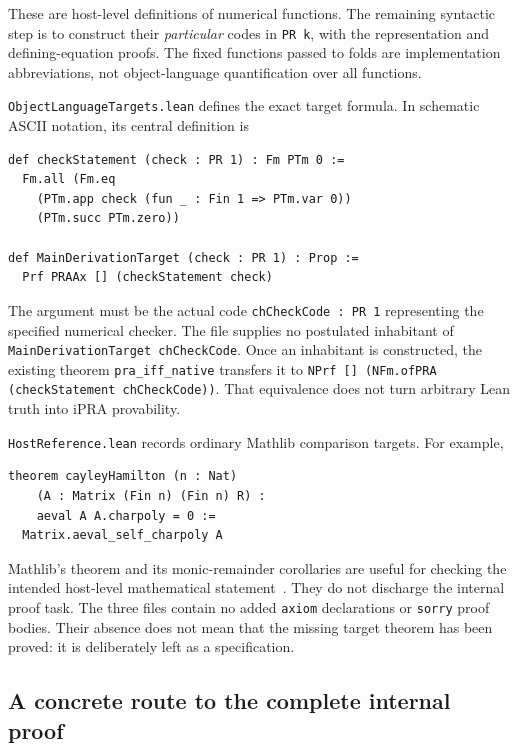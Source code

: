 These are host-level definitions of numerical functions. The remaining
syntactic step is to construct their \emph{particular} codes in
\texttt{PR k}, with the representation and defining-equation proofs.
The fixed functions passed to folds are implementation abbreviations,
not object-language quantification over all functions.

\texttt{ObjectLanguageTargets.lean} defines the exact target formula.
In schematic ASCII notation, its central definition is
\begin{lstlisting}
def checkStatement (check : PR 1) : Fm PTm 0 :=
  Fm.all (Fm.eq
    (PTm.app check (fun _ : Fin 1 => PTm.var 0))
    (PTm.succ PTm.zero))

def MainDerivationTarget (check : PR 1) : Prop :=
  Prf PRAAx [] (checkStatement check)
\end{lstlisting}
The argument must be the actual code \texttt{chCheckCode : PR 1}
representing the specified numerical checker. The file supplies no
postulated inhabitant of \texttt{MainDerivationTarget chCheckCode}.
Once an inhabitant is constructed, the existing theorem
\texttt{pra\_iff\_native} transfers it to
\texttt{NPrf [] (NFm.ofPRA (checkStatement chCheckCode))}.
That equivalence does not turn arbitrary Lean truth into iPRA provability.

\texttt{HostReference.lean} records ordinary Mathlib comparison targets.
For example,
\begin{lstlisting}
theorem cayleyHamilton (n : Nat)
    (A : Matrix (Fin n) (Fin n) R) :
    aeval A A.charpoly = 0 :=
  Matrix.aeval_self_charpoly A
\end{lstlisting}
Mathlib's theorem and its monic-remainder corollaries are useful for
checking the intended host-level mathematical statement~\cite{mathlib}.
They do not discharge the internal proof task. The three files contain
no added \texttt{axiom} declarations or \texttt{sorry} proof bodies.
Their absence does not mean that the missing target theorem has been
proved: it is deliberately left as a specification.

\subsection{A concrete route to the complete internal proof}

